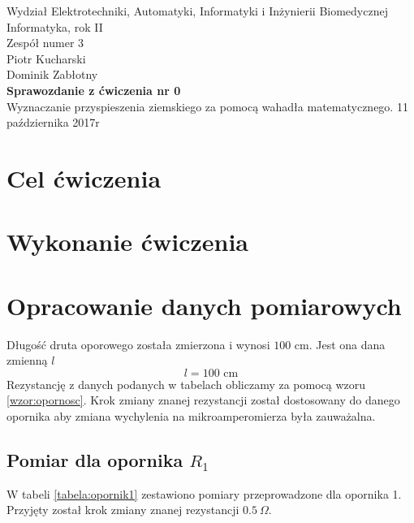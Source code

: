 \documentclass[a4paper,12pts]{article}
\begin{document}
	\thispagestyle{empty}
	\begin{flushleft}
		Wydział Elektrotechniki, Automatyki, Informatyki i Inżynierii Biomedycznej \\
		Informatyka, rok II \\
		Zespół numer 3 \\
		Piotr Kucharski \\
		Dominik Zabłotny \\
		\vspace*{\fill}
		{\large \textbf{Sprawozdanie z ćwiczenia nr 0} } \\
		Wyznaczanie przyspieszenia ziemskiego za pomocą wahadła matematycznego.		
		\vfill	
		11 października 2017r
	\end{flushleft}
	
	\newpage
	
	
	\section{Cel ćwiczenia}
	
	
	\section{Wykonanie ćwiczenia}
	
	
	\section{Opracowanie danych pomiarowych}
	Długość druta oporowego została zmierzona i wynosi $100$ cm. Jest ona dana zmienną $l$
	\begin{equation}
		l = 100 \textrm{ cm}
	\end{equation}
	Rezystancję z danych podanych w tabelach obliczamy za pomocą wzoru \ref{wzor:opornosc}. Krok zmiany znanej rezystancji został dostosowany do danego opornika aby zmiana wychylenia na mikroamperomierza była zauważalna.
	
	\subsection{Pomiar dla opornika $R_1$}
	W tabeli \ref{tabela:opornik1} zestawiono pomiary przeprowadzone dla opornika 1. Przyjęty został krok zmiany znanej rezystancji $0.5 ~\Omega$.
	
\end{document}
